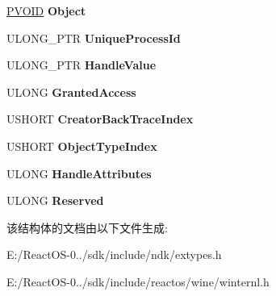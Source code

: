 \begin{DoxyCompactItemize}
\item 
\mbox{\label{struct___s_y_s_t_e_m___h_a_n_d_l_e___t_a_b_l_e___e_n_t_r_y___i_n_f_o___e_x_a93baf68a33dd3738601954b332aba11d}} 
\hyperlink{interfacevoid}{P\+V\+O\+ID} {\bfseries Object}
\item 
\mbox{\label{struct___s_y_s_t_e_m___h_a_n_d_l_e___t_a_b_l_e___e_n_t_r_y___i_n_f_o___e_x_affc3264b68ba3d1a5d89792fcbd939a4}} 
U\+L\+O\+N\+G\+\_\+\+P\+TR {\bfseries Unique\+Process\+Id}
\item 
\mbox{\label{struct___s_y_s_t_e_m___h_a_n_d_l_e___t_a_b_l_e___e_n_t_r_y___i_n_f_o___e_x_a5ef18ff0f440602bd3b60cd8ea05fbfc}} 
U\+L\+O\+N\+G\+\_\+\+P\+TR {\bfseries Handle\+Value}
\item 
\mbox{\label{struct___s_y_s_t_e_m___h_a_n_d_l_e___t_a_b_l_e___e_n_t_r_y___i_n_f_o___e_x_a29ef8e8cfebb1c13137a2beea6bae3ca}} 
U\+L\+O\+NG {\bfseries Granted\+Access}
\item 
\mbox{\label{struct___s_y_s_t_e_m___h_a_n_d_l_e___t_a_b_l_e___e_n_t_r_y___i_n_f_o___e_x_ae4965c1ebd2c64bf7741cd553d603b8e}} 
U\+S\+H\+O\+RT {\bfseries Creator\+Back\+Trace\+Index}
\item 
\mbox{\label{struct___s_y_s_t_e_m___h_a_n_d_l_e___t_a_b_l_e___e_n_t_r_y___i_n_f_o___e_x_a8f5ccdcc6b63e5378677bef3fbc60633}} 
U\+S\+H\+O\+RT {\bfseries Object\+Type\+Index}
\item 
\mbox{\label{struct___s_y_s_t_e_m___h_a_n_d_l_e___t_a_b_l_e___e_n_t_r_y___i_n_f_o___e_x_a0801d70b2ee2751489ff1a37cb434ec2}} 
U\+L\+O\+NG {\bfseries Handle\+Attributes}
\item 
\mbox{\label{struct___s_y_s_t_e_m___h_a_n_d_l_e___t_a_b_l_e___e_n_t_r_y___i_n_f_o___e_x_a447820e4efdd0ae2b23582020d09a55f}} 
U\+L\+O\+NG {\bfseries Reserved}
\end{DoxyCompactItemize}


该结构体的文档由以下文件生成\+:\begin{DoxyCompactItemize}
\item 
E\+:/\+React\+O\+S-\/0../sdk/include/ndk/extypes.\+h\item 
E\+:/\+React\+O\+S-\/0../sdk/include/reactos/wine/winternl.\+h\end{DoxyCompactItemize}
